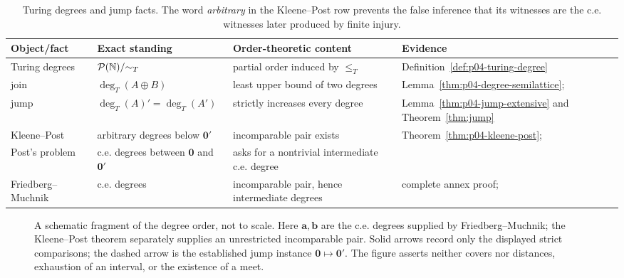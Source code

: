 \begin{table}[htbp]
\centering
\small
\begin{tabular}{@{}p{1.12in}p{1.25in}p{1.30in}p{1.55in}@{}}
\toprule
Object/fact & Exact standing & Order-theoretic content & Evidence \\
\midrule
Turing degrees & \(\mathcal P(\mathbb{N})/{\sim_T}\) & partial order induced by \(\leq_T\) & Definition~\ref{def:p04-turing-degree} \\
join & \(\deg_T(A\oplus B)\) & least upper bound of two degrees & Lemma~\ref{thm:p04-degree-semilattice}; \cite{KleenePost1954} \\
jump & \(\deg_T(A)'=\deg_T(A')\) & strictly increases every degree & Lemma~\ref{thm:p04-jump-extensive} and Theorem~\ref{thm:jump} \\
Kleene--Post & arbitrary degrees below \(\mathbf0'\) & incomparable pair exists & Theorem~\ref{thm:p04-kleene-post}; \cite{KleenePost1954} \\
Post's problem & c.e. degrees between \(\mathbf0\) and \(\mathbf0'\) & asks for a nontrivial intermediate c.e. degree & \cite{Post1944} \\
Friedberg--Muchnik & c.e. degrees & incomparable pair, hence intermediate degrees & complete annex proof; \cite{Friedberg1957,Muchnik1956} \\
\bottomrule
\end{tabular}
\caption{Turing degrees and jump facts.  The word
\emph{arbitrary} in the
Kleene--Post row prevents the false inference that its witnesses are the c.e.
witnesses later produced by finite injury.}
\label{tab:p04-degree-facts}
\end{table}

\begin{figure}[htbp]
\centering
{}
\caption{A schematic fragment of the degree order, not to scale.  Here
\(\mathbf a,\mathbf b\) are the c.e. degrees supplied
by Friedberg--Muchnik; the Kleene--Post theorem separately supplies an
unrestricted incomparable pair.  Solid arrows record only the displayed
strict comparisons; the dashed arrow is the established jump instance
\(\mathbf0\mapsto\mathbf0'\).  The figure asserts neither covers nor
distances, exhaustion of an interval, or the existence of a meet.}
\label{fig:p04-turing-degrees}
\end{figure}

